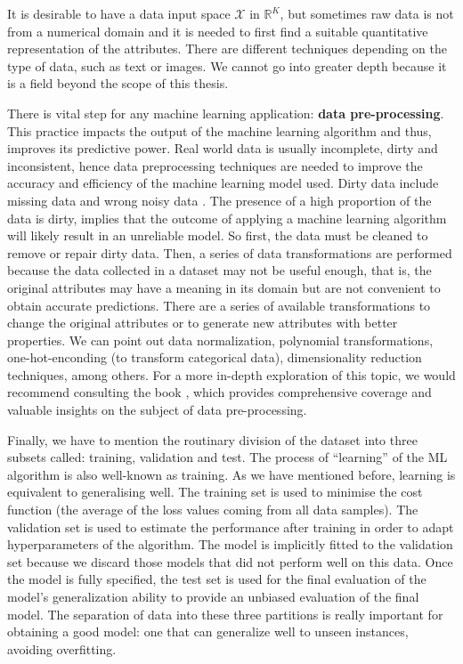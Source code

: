 It is desirable to have a data input space $\mathcal{X}$ in $\mathbb{R}^K$, but sometimes raw data is not from a numerical domain and it is needed to first find a suitable quantitative representation of the attributes. There are different techniques depending on the type of data, such as text or images. We cannot go into greater depth because it is a field beyond the scope of this thesis. 

There is vital step for any machine learning application: \textbf{data pre-processing}. This practice impacts the output of the machine learning algorithm and thus, improves its predictive power. Real world data is usually incomplete, dirty and inconsistent, hence data preprocessing techniques are needed to improve the accuracy and efficiency of the machine learning model used. Dirty data include missing data and wrong noisy data . The presence of a high proportion of the data is dirty, implies that the outcome of applying a machine learning algorithm will likely result in an unreliable model. So first, the data must be cleaned to remove or repair dirty data. Then, a series of data transformations are performed because the data collected in a dataset may not be useful enough, that is, the original attributes may have a meaning in its domain but are not convenient to obtain accurate predictions. There are a series of available transformations to change the original attributes or to generate new attributes with better properties. We can point out data normalization, polynomial transformations, one-hot-enconding (to transform categorical data), dimensionality reduction techniques, among others. For a more in-depth exploration of this topic, we would recommend consulting the book \cite{garcia2015data}, which provides comprehensive coverage and valuable insights on the subject of data pre-processing.

Finally, we have to mention the routinary division of the dataset into three subsets called: training, validation and test. The process of ``learning'' of the ML algorithm is also well-known as training. As we have mentioned before, learning is equivalent to generalising well. The training set is used to minimise the cost function (the average of the loss values coming from all data samples). The validation set is used to estimate the performance after training in order to adapt hyperparameters of the algorithm. The model is implicitly fitted to the validation set because we discard those models that did not perform well on this data. Once the model is fully specified, the test set is used for the final evaluation of the model's generalization ability to provide an unbiased evaluation of the final model. The separation of data into these three partitions is really important for obtaining a good model: one that can generalize well to unseen instances, avoiding overfitting. 


